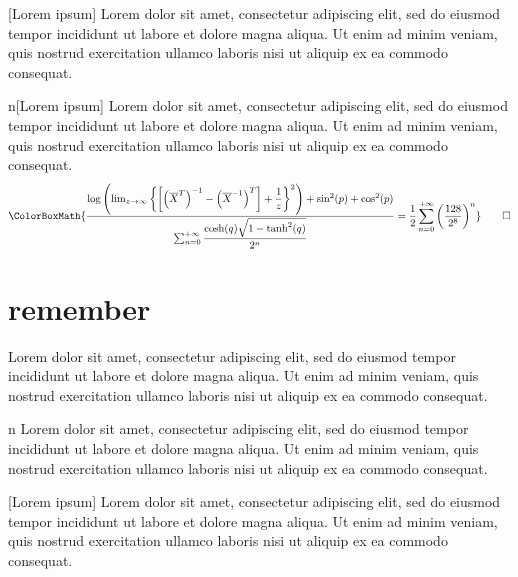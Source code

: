 \begin{tipsandtricks}{}[Lorem ipsum]
	Lorem dolor sit amet, consectetur adipiscing elit, sed do eiusmod tempor incididunt ut labore et dolore magna aliqua. Ut enim ad minim veniam, quis nostrud exercitation ullamco laboris nisi ut aliquip ex ea commodo consequat.
\end{tipsandtricks}

\begin{tipsandtricks}{n}[Lorem ipsum]
	Lorem dolor sit amet, consectetur adipiscing elit, sed do eiusmod tempor incididunt ut labore et dolore magna aliqua. Ut enim ad minim veniam, quis nostrud exercitation ullamco laboris nisi ut aliquip ex ea commodo consequat.
	\begin{equation*}
		\ColorBoxMath{\dfrac{\log\left(\lim_{z\to\infty}\left\{\left[\left(\overline{X}^{T}\right)^{-1}-\left(\overline{X}^{-1}\right)^T\right]+\dfrac{1}{z}\right\}^2\right)+\sin^2(p)+\cos^2(p)}{\sum_{n=0}^{+\infty}\dfrac{\cosh(q)\sqrt{1-\tanh^2(q)}}{2^n}}=\dfrac{1}{2}\sum_{n=0}^{+\infty}\left(\dfrac{128}{2^8}\right)^n}\qedhere
	\end{equation*}
\end{tipsandtricks}

\newpage

\section{remember}

\begin{remember}{}
	Lorem dolor sit amet, consectetur adipiscing elit, sed do eiusmod tempor incididunt ut labore et dolore magna aliqua. Ut enim ad minim veniam, quis nostrud exercitation ullamco laboris nisi ut aliquip ex ea commodo consequat.
\end{remember}

\begin{remember}{n}
	Lorem dolor sit amet, consectetur adipiscing elit, sed do eiusmod tempor incididunt ut labore et dolore magna aliqua. Ut enim ad minim veniam, quis nostrud exercitation ullamco laboris nisi ut aliquip ex ea commodo consequat.
\end{remember}

\begin{remember}{}[Lorem ipsum]
	Lorem dolor sit amet, consectetur adipiscing elit, sed do eiusmod tempor incididunt ut labore et dolore magna aliqua. Ut enim ad minim veniam, quis nostrud exercitation ullamco laboris nisi ut aliquip ex ea commodo consequat.
\end{remember}

